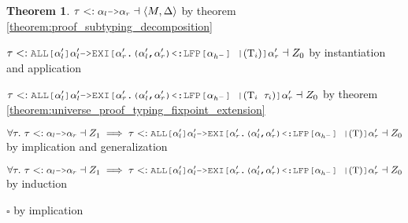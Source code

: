 \documentclass[acmsmall]{acmart}
\theoremstyle{definition}
\newtheorem{theorem}{Theorem}[section]
\begin{document}
\begin{theorem}
      \item \Z\Z\Z $
        \tau \subtypes \J{$\alpha_l$->$\alpha_r$} \given\left<M, \Delta\right>
      $ by theorem \ref{theorem:proof_subtyping_decomposition}

      \item \Z\Z\Z $
        \tau
        \subtypes
        \J{ALL[$\alpha_l'$]$\alpha_l'$->EXI[$\alpha_r'$.($\alpha_l'$,$\alpha_r'$)<:LFP[$\alpha_{h^-}$] |$(\Tau_i)$]$\alpha_r'$} 
        \given Z_0
      $ by instantiation and application 
      \item \Z\Z\Z $
        \tau
        \subtypes
        \J{ALL[$\alpha_l'$]$\alpha_l'$->EXI[$\alpha_r'$.($\alpha_l'$,$\alpha_r'$)<:LFP[$\alpha_{h^-}$] |$(\Tau_i\ \tau_i)$]$\alpha_r'$} 
        \given Z_0
      $ by theorem \ref{theorem:universe_proof_typing_fixpoint_extension}
    \item \Z\Z $
      \forall \tau .\ 
      \tau \subtypes \J{$\alpha_l$->$\alpha_r$} \given Z_1
      \implies
      \tau
      \subtypes
      \J{ALL[$\alpha_l'$]$\alpha_l'$->EXI[$\alpha_r'$.($\alpha_l'$,$\alpha_r'$)<:LFP[$\alpha_{h^-}$] |$(\Tau)$]$\alpha_r'$} 
      \given Z_0
    $ by implication and generalization 


  \item \Z $
    \forall \tau .\ 
    \tau \subtypes \J{$\alpha_l$->$\alpha_r$} \given Z_1
    \implies
    \tau
    \subtypes
    \J{ALL[$\alpha_l'$]$\alpha_l'$->EXI[$\alpha_r'$.($\alpha_l'$,$\alpha_r'$)<:LFP[$\alpha_{h^-}$] |$(\Tau)$]$\alpha_r'$} 
    \given Z_0
  $ by induction
  \item $\square$ by implication
\end{theorem}
\end{document}
